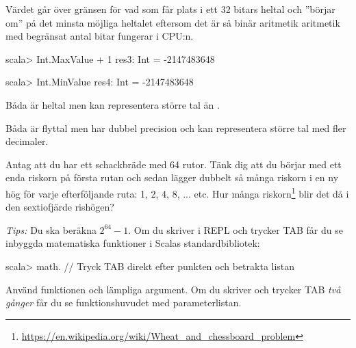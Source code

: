 \TaskSolved \what

\SubtaskSolved

\begin{ConceptConnections}

\end{ConceptConnections}

\SubtaskSolved Värdet går över gränsen för vad som får plats i ett 32 bitars heltal och ''börjar om'' på det minsta möjliga heltalet  eftersom det är så binär aritmetik aritmetik med begränsat antal bitar fungerar i CPU:n.
\begin{REPL}
scala> Int.MaxValue + 1
res3: Int = -2147483648

scala> Int.MinValue
res4: Int = -2147483648
\end{REPL}

\SubtaskSolved Båda är heltal men  kan representera större tal än .

\SubtaskSolved Båda är flyttal men  har dubbel precision och kan representera större tal med fler decimaler.



\QUESTEND






\QUESTBEGIN

\Task \what

\Subtask Antag att du har ett schackbräde med 64 rutor. Tänk dig att du börjar med ett enda riskorn på första rutan och sedan lägger dubbelt så många riskorn i en ny hög för varje efterföljande ruta: 1, 2, 4, 8, ...  etc. Hur många riskorn\footnote{\url{https://en.wikipedia.org/wiki/Wheat_and_chessboard_problem}} blir det då i den sextiofjärde rishögen?

\emph{Tips:} Du ska beräkna $2^{64} - 1$. Om du skriver  i REPL och trycker TAB får du se inbyggda matematiska funktioner i Scalas standardbibliotek:
\begin{REPL}
scala> math.    // Tryck TAB direkt efter punkten och betrakta listan
\end{REPL}
Använd funktionen  och lämpliga argument. Om du skriver  och trycker TAB \emph{två gånger} får du se funktionshuvudet med parameterlistan.

